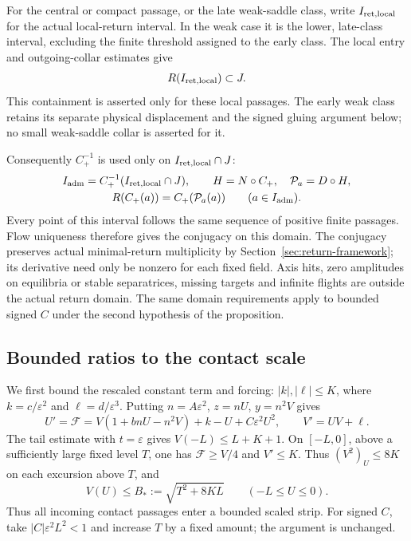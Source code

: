 For the central or compact passage, or the late weak-saddle class,
write $I_{\rm ret,local}$ for the actual local-return interval.
In the weak case it is the lower, late-class interval, excluding the
finite threshold assigned to the early class. The local entry and
outgoing-collar estimates give
\[
 R(I_{\rm ret,local})\subset J.
\]
This containment is asserted only for these local passages. The early
weak class retains its separate physical displacement and the signed
gluing argument below; no small weak-saddle collar is asserted for it.

Consequently $C_+^{-1}$ is used only on $I_{\rm ret,local}\cap J$:
\[
\begin{gathered}
 I_{\rm adm}=C_+^{-1}(I_{\rm ret,local}\cap J),\qquad
 H=N\circ C_+,\quad \mathcal P_a=D\circ H,\\
 R(C_+(a))=C_+(\mathcal P_a(a))\qquad(a\in I_{\rm adm}).
\end{gathered}
\]
Every point of this interval follows the same sequence of positive
finite passages. Flow uniqueness therefore gives the conjugacy on this
domain.
The conjugacy preserves actual minimal-return multiplicity by
Section~\ref{sec:return-framework}; its derivative need only be nonzero
for each fixed field.
Axis hits, zero amplitudes on
equilibria or stable separatrices, missing targets and infinite flights
are outside the actual return domain. The same domain requirements
apply to bounded signed $C$ under the second hypothesis of the proposition.

\subsection{Bounded ratios to the contact scale}\label{subsec:simple-bounded}

We first bound the rescaled constant term and forcing:
$|k|,|\ell|\le K$, where
$k=c/\varepsilon^2$ and $\ell=d/\varepsilon^3$.
Putting $n=A\varepsilon^2$, $z=nU$, $y=n^2V$ gives
\begin{equation}\label{eq:simple-bounded-system}
 U'=\mathcal F=V(1+bnU-n^2V)+k-U+C\varepsilon^2U^2,
 \qquad V'=UV+\ell.
\end{equation}
The tail estimate with $t=\varepsilon$ gives
$V(-L)\le L+K+1$.  On $[-L,0]$, above a sufficiently large fixed
level $T$, one has $\mathcal F\ge V/4$ and $V'\le K$.
Thus $(V^2)_U\le8K$ on each excursion above $T$, and
\begin{equation}\label{eq:simple-bounded-height}
 V(U)\le B_*:=\sqrt{T^2+8KL}\qquad(-L\le U\le0).
\end{equation}
Thus all incoming contact passages enter a bounded scaled strip. For
signed $C$, take $|C|\varepsilon^2L^2<1$ and increase $T$
by a fixed amount; the argument is unchanged.

